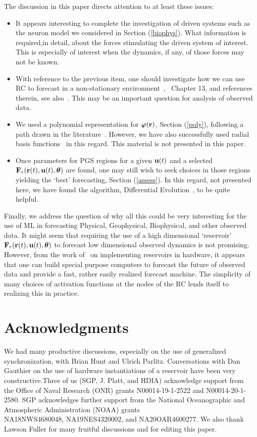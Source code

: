 \documentclass[12pt]{article}
\begin{document}
The discussion in this paper directs attention to at least these issues:
\begin{itemize}
\item It appears interesting to complete the investigation of driven systems such as the neuron model we considered in Section (\ref{biophys}). What information is required,in detail, about the forces stimulating the driven system of interest. This is especially of interest when the dynamics, if any, of those forces may not be known.
\item With reference to the previous item, one should investigate how we can use RC to forecast in a non-stationary environment~\cite{hegger00,kennel97},~\cite{kantz04} Chapter 13, and references therein, see  also~\cite{sugi12}. This may be an important question for analysis of observed data.
\item We used a polynomial representation for $\mbox{$\boldsymbol{\varphi}$}(\mbox{{\bf r}})$, Section (\ref{poly}), following a path drawn in the literature~\cite{hunt19}. However, we have also successfully used radial basis functions~\cite{silverman86,p-rbfmir-87,buhmann09,casdagli89,billings13,broom88,Scott05,guill98} in this regard. This material is not presented in this paper. 
\item Once parameters for PGS regions for a given $\mbox{$\bf{u}$}(t)$ and a selected\\ $\mbox{$\bf{F}$}_r(\mbox{{\bf r}}(t),\mbox{$\bf{u}$}(t),\mbox{$\boldsymbol{\theta}$})$ are found, one may still wish to seek choices in those regions yielding the `best' forecasting, Section (\ref{assess}). In this regard, not presented here, we have found the algorithm, Differential Evolution~\cite{storn97}, to be quite helpful.
\end{itemize}

Finally, we address the question of why all this could be very interesting for the use of ML in forecasting Physical, Geophysical, Biophysical, and other observed data. It might seem that requiring the use of a high dimensional `reservoir' $\mbox{$\bf{F}$}_r(\mbox{{\bf r}}(t),\mbox{$\bf{u}$}(t),\mbox{$\boldsymbol{\theta}$})$ to forecast low dimensional observed dynamics is not promising. However, from the work of~\cite{canaday18} on implementing reservoirs in hardware, it appears that one can build special purpose computers to forecast the future of observed data and provide a fast, rather easily realized forecast machine. The simplicity of many choices of activation functions at the nodes of the RC lends itself to realizing this in practice.


 \section*{Acknowledgments} We had many productive discussions, especially on the use of generalized synchronization, with Brian Hunt and Ulrich Parlitz. Conversations with Dan Gauthier on the use of hardware instantiations of a reservoir have been very constructive.Three of us (SGP, J. Platt, and HDIA) acknowledge support from the Office of Naval Research (ONR) grants N00014-19-1-2522 and N00014-20-1-2580. SGP acknowledges further support from the National Oceanographic and Atmospheric Administration (NOAA) grants\\ NA18NWS4680048, NA19NES4320002, and NA20OAR4600277. We also thank Lawson Fuller for many fruitful discussions and for editing this paper.
 
\end{document}
